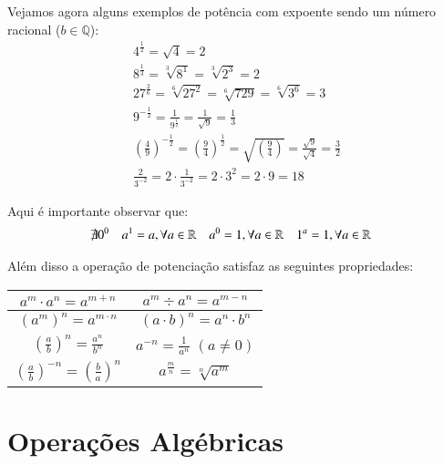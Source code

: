  \begin{exem}
  Vejamos agora alguns exemplos de potência com expoente sendo um número racional ($b \in \mathbb{Q}$):
  \begin{eqnarray*}
   4^{\frac{1}{2}}= \sqrt{4}= 2 \\
   8^{\frac{1}{3}}= \sqrt[3]{8^1}= \sqrt[3]{2^{3}}= 2 \\
   27^{\frac{2}{6}}= \sqrt[6]{27^2}= \sqrt[6]{729}= \sqrt[6]{3^6}= 3\\
   9^{-\frac{1}{2}}= \frac{1}{9^{\frac{1}{2}}}= \frac{1}{\sqrt{9}}= \frac{1}{3} \\
   \left(\frac{4}{9}\right)^{-\frac{1}{2}}= \left(\frac{9}{4}\right)^{\frac{1}{2}}= \sqrt{\left(\frac{9}{4}\right)}=\frac{\sqrt{9}}{\sqrt{4}}= \frac{3}{2} \\
   \frac{2}{3^{-2}}= 2 \cdot \frac{1}{3^{-2}}= 2 \cdot 3^{2}= 2 \cdot 9= 18
  \end{eqnarray*}

 \end{exem}


 \vskip0.3cm

 \colorbox{amarelo}{
 \begin{minipage}{0.9\linewidth}
 \begin{center}
 Aqui é importante observar que:
 \begin{align*}
 & \nexists 0^0 & & a^1= a, \forall a \in \mathbb{R} & & a^0= 1, \forall a \in \mathbb{R} & & 1^a= 1, \forall a \in \mathbb{R}
 \end{align*}
 \end{center}
 \end{minipage}}

 Além disso a operação de potenciação satisfaz as seguintes propriedades:

  \begin{table}[H]
 \centering
 \begin{tabular}{|c|c|} \hline
 $a^m \cdot a^n= a^{m + n}$ & $a^m \div a^n= a^{m - n}$ \\ \hline
 $(a^m)^n= a^{m \cdot n}$ & $(a \cdot b)^n= a^n \cdot b^n$ \\ \hline
 $\left(\frac{a}{b}\right)^n= \frac{a^n}{b^n}$ & $a^{-n}= \frac{1}{a^n}$ $(a \neq 0)$ \\ \hline
 $\left(\frac{a}{b} \right)^{-n}= \left(\frac{b}{a} \right)^{n}$ & $a^{\frac{m}{n}}= \sqrt[n]{a^m}$ \\\hline
 \end{tabular}
 \end{table}

 \section{Operações Algébricas}

